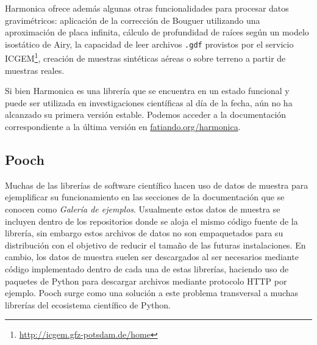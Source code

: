 Harmonica ofrece además algunas otras funcionalidades para procesar datos
gravimétricos: aplicación de la corrección de Bouguer utilizando una
aproximación de placa infinita, cálculo de profundidad de raíces según un
modelo isostático de Airy, la capacidad de leer archivos \texttt{.gdf}
provistos por el servicio
ICGEM\footnote{\url{http://icgem.gfz-potsdam.de/home}}, creación de muestras
sintéticas aéreas o sobre terreno a partir de muestras reales.

Si bien Harmonica es una librería que se encuentra en un estado funcional
y puede ser utilizada en investigaciones científicas al día de la fecha, aún no
ha alcanzado su primera versión estable.
Podemos acceder a la documentación correspondiente a la última versión en
\href{https://www.fatiando.org/harmonica}{fatiando.org/harmonica}.






\subsection{Pooch}

Muchas de las librerías de software científico hacen uso de datos de muestra
para ejemplificar su funcionamiento en las secciones de la documentación que se
conocen como \emph{Galería de ejemplos}.
Usualmente estos datos de muestra se incluyen dentro de los repositorios donde
se aloja el mismo código fuente de la librería, sin embargo estos archivos de
datos no son empaquetados para su distribución con el objetivo de reducir el
tamaño de las futuras instalaciones.
En cambio, los datos de muestra suelen ser descargados al ser necesarios
mediante código implementado dentro de cada una de estas librerías, haciendo
uso de paquetes de Python para descargar archivos mediante protocolo HTTP por
ejemplo.
Pooch surge como una solución a este problema transversal a muchas
librerías del ecosistema científico de Python.




